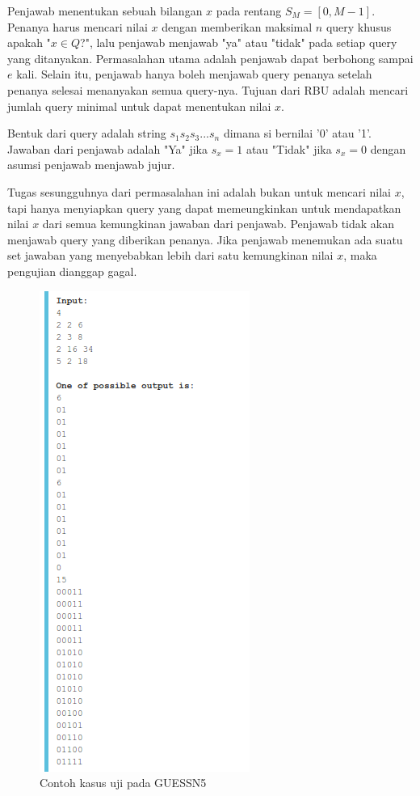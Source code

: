 \documentclass[conference,compsoc]{IEEEtran}
\begin{document}
Penjawab menentukan sebuah bilangan $x$ pada rentang $S_M=[0,M-1]$. Penanya harus mencari nilai $x$ dengan memberikan maksimal $n$ query khusus apakah "$x \in Q$?", lalu penjawab menjawab "ya" atau "tidak" pada setiap query yang ditanyakan. Permasalahan utama adalah penjawab dapat berbohong sampai $e$ kali. Selain itu, penjawab hanya boleh menjawab query penanya setelah penanya selesai menanyakan semua query-nya. Tujuan dari RBU adalah mencari jumlah query minimal untuk dapat menentukan nilai $x$.

Bentuk dari query adalah string $s_1s_2s_3...s_n$ dimana si bernilai '0' atau '1'. Jawaban dari penjawab adalah "Ya" jika $s_x=1$ atau "Tidak" jika $s_x=0$ dengan asumsi penjawab menjawab jujur.

Tugas sesungguhnya dari permasalahan ini adalah bukan untuk mencari nilai $x$, tapi hanya menyiapkan query yang dapat memeungkinkan untuk mendapatkan nilai $x$ dari semua kemungkinan jawaban dari penjawab. Penjawab tidak akan menjawab query yang diberikan penanya. Jika penjawab menemukan ada suatu set jawaban yang menyebabkan lebih dari satu kemungkinan nilai $x$, maka pengujian dianggap gagal.

\begin{figure}
\centering
\includegraphics[scale=0.6]{../img/example.png}
\caption{Contoh kasus uji pada GUESSN5}
\label{fig:guessn5_test_case}
\end{figure}
\end{document}
